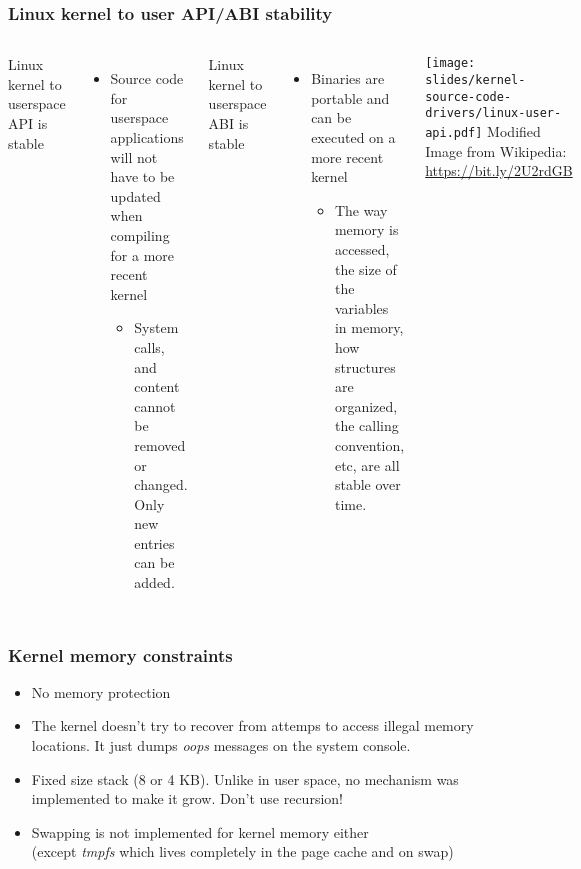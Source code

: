 \begin{frame}
  \frametitle{Linux kernel to user API/ABI stability}
  \begin{columns}
    Linux kernel to userspace API is stable
    \begin{itemize}
    \item Source code for userspace applications will not have to be
      updated when compiling for a more recent kernel
      \begin{itemize}
      \item System calls,  and  content cannot be
        removed or changed. Only new entries can be added.
      \end{itemize}
    \end{itemize}
    Linux kernel to userspace ABI is stable
    \begin{itemize}
    \item Binaries are portable and can be executed on a more recent
      kernel
      \begin{itemize}
      \item The way memory is accessed, the size of the variables in
        memory, how structures are organized, the calling convention,
        etc, are all stable over time.
      \end{itemize}
    \end{itemize}
    \texttt{[image: slides/kernel-source-code-drivers/linux-user-api.pdf]}
    \tiny
    Modified Image from Wikipedia:\\
    \url{https://bit.ly/2U2rdGB}
  \end{columns}
\end{frame}

\begin{frame}
  \frametitle{Kernel memory constraints}
  \begin{itemize}
  \item No memory protection
  \item The kernel doesn't try to recover from attemps to access illegal
    memory locations. It just dumps {\em oops} messages on the system console.
  \item Fixed size stack (8 or 4 KB). Unlike in user space, no mechanism
    was implemented to make it grow. Don't use recursion!
  \item Swapping is not implemented for kernel memory either\\
    (except {\em tmpfs} which lives completely in the page cache and on swap)
  \end{itemize}
\end{frame}

